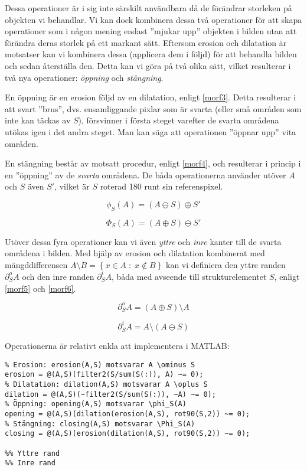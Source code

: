 \documentclass[../rapport_MVEX01-11-05]{subfiles}
\begin{document}
Dessa operationer är i sig inte särskilt användbara då de förändrar
storleken på objekten vi behandlar. Vi kan dock kombinera dessa två
operationer för att skapa operationer som i någon mening endast 
''mjukar upp'' objekten i bilden utan att förändra deras storlek på
ett markant sätt. Eftersom erosion och dilatation är motsatser kan vi
kombinera dessa (applicera dem i följd) för att behandla bilden och
sedan återställa den. Detta kan vi göra på två olika sätt, vilket
resulterar i två nya operationer: \emph{öppning} och \emph{stängning}.

En öppning är en erosion följd av en dilatation, enligt \eqref{morf3}.
Detta resulterar i att svart ''brus'', dvs. ensamliggande pixlar som
är svarta (eller små områden som inte kan täckas av $S$), försvinner i
första steget varefter de svarta områdena utökas igen i det andra
steget. Man kan säga att operationen ''öppnar upp'' vita områden.

En stängning består av motsatt procedur, enligt \eqref{morf4}, och
resulterar i princip i en ''öppning'' av de \emph{svarta} områdena. De
båda operationerna använder utöver $A$ och $S$ även $S'$, vilket är
$S$ roterad 180\textdegree{} runt sin referenspixel.

\begin{equation}
  \label{morf3}
  \phi_S(A)=(A\ominus S)\oplus S'
\end{equation}

\begin{equation}
  \label{morf4}
  \Phi_S(A)=(A\oplus S)\ominus S'
\end{equation}

Utöver dessa fyra operationer kan vi även \emph{yttre} och \emph{inre}
kanter till de svarta områdena i bilden. Med hjälp av erosion och
dilatation kombinerat med mängddifferensen $A\setminus B=\left\{x\in
A\;:\;x\not\in B\right\}$ kan vi definiera den yttre randen
$\partial_S^o A$ och den inre randen $\partial_S^i A$, båda med
avseende till strukturelementet $S$, enligt \eqref{morf5} och
\eqref{morf6}.

\begin{equation}
  \label{morf5}
  \partial_S^o A = \left(A\oplus S\right)\setminus A
\end{equation}

\begin{equation}
  \label{morf6}
  \partial_S^i A = A\setminus\left(A\ominus S\right)
\end{equation}

Operationerna är relativt enkla att implementera i MATLAB:

\begin{lstlisting}
% Erosion: erosion(A,S) motsvarar A \ominus S
erosion = @(A,S)(filter2(S/sum(S(:)), A) ~= 0);
% Dilatation: dilation(A,S) motsvarar A \oplus S
dilation = @(A,S)(~filter2(S/sum(S(:)), ~A) ~= 0);
% Öppning: opening(A,S) motsvarar \phi_S(A)
opening = @(A,S)(dilation(erosion(A,S), rot90(S,2)) ~= 0);
% Stängning: closing(A,S) motsvarar \Phi_S(A)
closing = @(A,S)(erosion(dilation(A,S), rot90(S,2)) ~= 0);

%% Yttre rand
%% Inre rand
\end{lstlisting}

\end{document}
